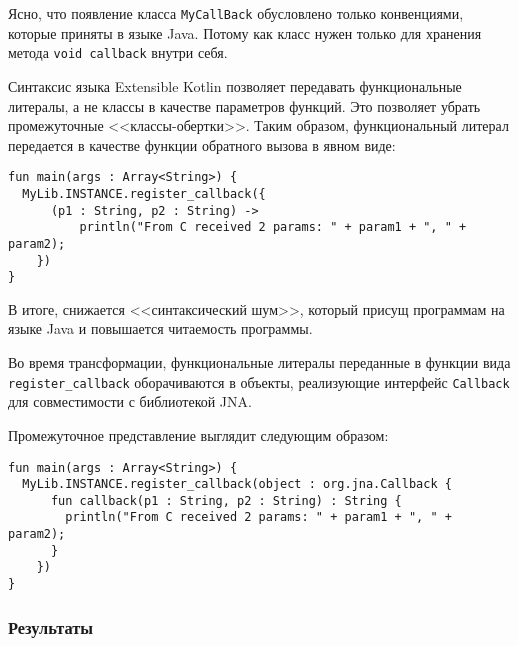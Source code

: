 Ясно, что появление класса \texttt{MyCallBack} обусловлено только конвенциями, которые приняты в языке Java. Потому как класс нужен только для хранения метода \texttt{void callback} внутри себя.

Синтаксис языка Extensible Kotlin позволяет передавать функциональные литералы, а не классы в качестве параметров функций. Это позволяет убрать промежуточные <<классы-обертки>>. Таким образом, функциональный литерал передается в качестве функции обратного вызова в явном виде:
\begin{lstlisting}
fun main(args : Array<String>) {
  MyLib.INSTANCE.register_callback({
      (p1 : String, p2 : String) -> 
          println("From C received 2 params: " + param1 + ", " + param2);
    })
}
\end{lstlisting}

В итоге, снижается <<синтаксический шум>>, который присущ программам на языке Java и повышается читаемость программы.

Во время трансформации, функциональные литералы переданные в функции вида \texttt{register\_callback} оборачиваются в объекты, реализующие интерфейс \texttt{Callback} для совместимости с библиотекой JNA.

Промежуточное представление выглядит следующим образом:
\begin{lstlisting}
fun main(args : Array<String>) {
  MyLib.INSTANCE.register_callback(object : org.jna.Callback {
      fun callback(p1 : String, p2 : String) : String {
        println("From C received 2 params: " + param1 + ", " + param2);
      }
    })
}
\end{lstlisting}

\subsubsection{Результаты}